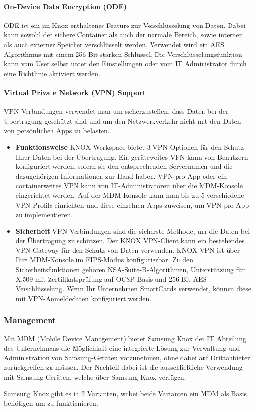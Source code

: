 \paragraph{On-Device Data Encryption (ODE)}
ODE ist ein im Knox enthaltenes Feature zur Verschlüsselung von Daten. Dabei kann sowohl der sichere Container als auch der normale Bereich, sowie interner als auch externer Speicher verschlüsselt werden. Verwendet wird ein AES Algorithmus mit einem 256 Bit starken Schlüssel. Die Verschlüsselungsfunktion kann vom User selbst unter den Einstellungen oder vom IT Administrator durch eine Richtlinie aktiviert werden.
\paragraph{Virtual Private Network (VPN) Support }
VPN-Verbindungen verwendet man um sicherzustellen, dass Daten bei der Übertragung geschützt sind und um den Netzwerkverkehr nicht mit den Daten von persönlichen Apps zu belasten.
\begin{itemize}
	\item \textbf{Funktionsweise} \newline 
	KNOX Workspace bietet 3 VPN-Optionen für den Schutz Ihrer Daten bei der Übertragung. Ein geräteweites VPN kann von Benutzern konfiguriert werden, sofern sie den entsprechenden Servernamen und die dazugehörigen Informationen zur Hand haben. VPN pro App oder ein containerweites VPN kann von IT-Administratoren über die MDM-Konsole eingerichtet werden. Auf der MDM-Konsole kann man bis zu 5 verschiedene VPN-Profile einrichten und diese einzelnen Apps zuweisen, um VPN pro App zu implementieren.
	\item \textbf{Sicherheit} \newline 
	VPN-Verbindungen sind die sicherste Methode, um die Daten bei der Übertragung zu schützen. Der KNOX VPN-Client kann ein bestehendes VPN-Gateway für den Schutz von Daten verwenden. KNOX VPN ist über Ihre MDM-Konsole im FIPS-Modus konfigurierbar. Zu den Sicherheitsfunktionen gehören NSA-Suite-B-Algorithmen, Unterstützung für X.509 mit Zertifikatsprüfung auf OCSP-Basis und 256-Bit-AES-Verschlüsselung. Wenn Ihr Unternehmen SmartCards verwendet, können diese mit VPN-Anmeldedaten konfiguriert werden.
\end{itemize}

\subsubsection{Management}
Mit MDM (Mobile Device Management) bietet Samsung Knox der IT Abteilung des Unternehmens die Möglichkeit eine integrierte Lösung zur Verwaltung und Administration von Samsung-Geräten vorzunehmen, ohne dabei auf Drittanbieter zurückgreifen zu müssen. Der Nachteil dabei ist die ausschließliche Verwendung mit Samsung-Geräten, welche über Samsung Knox verfügen.
\par
Samsung Knox gibt es in 2 Varianten, wobei beide Varianten ein MDM als Basis benötigen um zu funktionieren.
